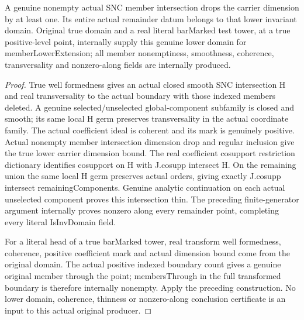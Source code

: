 \begin{theorem}
\label{hir:member-lower-extension-actual-domain}
\leanok
A genuine nonempty actual SNC member intersection drops the carrier dimension
by at least one. Its entire actual remainder datum belongs to that lower
invariant domain. Original true domain and a real literal barMarked test tower,
at a true positive-level point, internally supply this genuine lower domain
for memberLowerExtension; all member nonemptiness, smoothness, coherence,
transversality and nonzero-along fields are internally produced.
\end{theorem}
\begin{proof}
True well formedness gives an actual closed smooth SNC intersection H and real
transversality to the actual boundary with those indexed members deleted.
A genuine selected/unselected global-component subfamily is closed and smooth;
its same local H germ preserves transversality in the actual coordinate family.
The actual coefficient ideal is coherent and its mark is genuinely positive.
Actual nonempty member intersection dimension drop and regular inclusion give
the true lower carrier dimension bound. The real coefficient cosupport
restriction dictionary identifies cosupport on H with J.cosupp intersect H.
On the remaining union the same local H germ preserves actual orders, giving
exactly J.cosupp intersect remainingComponents. Genuine analytic continuation
on each actual unselected component proves this intersection thin. The preceding
finite-generator argument internally proves nonzero along every remainder
point, completing every literal IsInvDomain field.

For a literal head of a true barMarked tower, real transform well formedness,
coherence, positive coefficient mark and actual dimension bound come from the
original domain. The actual positive indexed boundary count gives a genuine
original member through the point; membersThrough in the full transformed
boundary is therefore internally nonempty. Apply the preceding construction.
No lower domain, coherence, thinness or nonzero-along conclusion certificate
is an input to this actual original producer.
\end{proof}

